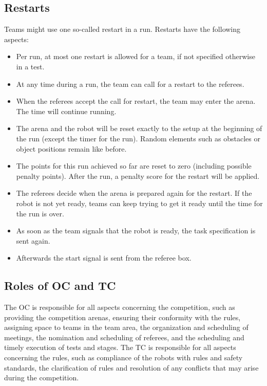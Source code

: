 \subsection{Restarts}
Teams might use one so-called restart in a run. Restarts have the following aspects:

\begin{itemize}

	\item Per run, at most one restart is allowed for a team, if not specified 			otherwise in a test.
	\item At any time during a run, the team can call for a restart to the 				referees.
	\item When the referees accept the call for restart, the team may enter the 			arena. The time will continue running.
	\item The arena and the robot will be reset exactly to the setup at the 				beginning of the run (except the timer for the run). Random elements such as 			obstacles or object positions remain like before.
	\item The points for this run achieved so far are reset to zero (including 			possible penalty points). After the run, a penalty score for the restart will 	be applied.
	\item The referees decide when the arena is prepared again for the restart. If 	the robot is not yet ready, teams can keep trying to get it ready until the 			time for the run is over.
	\item As soon as the team signals that the robot is ready, the task 					specification is sent again.
	\item Afterwards the start signal is sent from the referee box.

\end{itemize}

\subsection{Roles of OC and TC}
The OC is responsible for all aspects concerning the competition, such as providing the competition arenas, ensuring their conformity with the rules, assigning space to teams in the team area, the organization and scheduling of meetings, the nomination and scheduling of referees, and the scheduling and timely execution of tests and stages.
The TC is responsible for all aspects concerning the rules, such as compliance of the robots with rules and safety standards, the clarification of rules and resolution of any conflicts that may arise during the competition.

